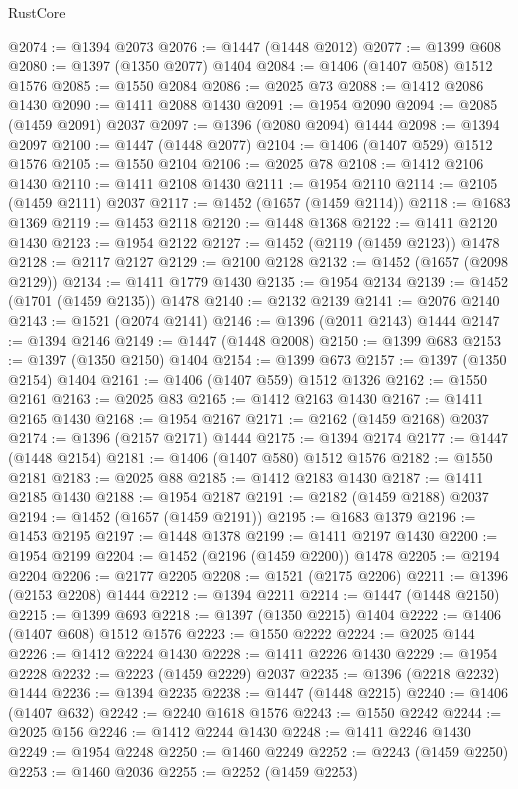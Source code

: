 \begin{lexlean}{RustCore}
\begin{coremodule}
@2074 := @1394 @2073
@2076 := @1447 (@1448 @2012)
@2077 := @1399 @608
@2080 := @1397 (@1350 @2077) @1404
@2084 := @1406 (@1407 @508) @1512 @1576
@2085 := @1550 @2084
@2086 := @2025 @73
@2088 := @1412 @2086 @1430
@2090 := @1411 @2088 @1430
@2091 := @1954 @2090
@2094 := @2085 (@1459 @2091) @2037
@2097 := @1396 (@2080 @2094) @1444
@2098 := @1394 @2097
@2100 := @1447 (@1448 @2077)
@2104 := @1406 (@1407 @529) @1512 @1576
@2105 := @1550 @2104
@2106 := @2025 @78
@2108 := @1412 @2106 @1430
@2110 := @1411 @2108 @1430
@2111 := @1954 @2110
@2114 := @2105 (@1459 @2111) @2037
@2117 := @1452 (@1657 (@1459 @2114))
@2118 := @1683 @1369
@2119 := @1453 @2118
@2120 := @1448 @1368
@2122 := @1411 @2120 @1430
@2123 := @1954 @2122
@2127 := @1452 (@2119 (@1459 @2123)) @1478
@2128 := @2117 @2127
@2129 := @2100 @2128
@2132 := @1452 (@1657 (@2098 @2129))
@2134 := @1411 @1779 @1430
@2135 := @1954 @2134
@2139 := @1452 (@1701 (@1459 @2135)) @1478
@2140 := @2132 @2139
@2141 := @2076 @2140
@2143 := @1521 (@2074 @2141)
@2146 := @1396 (@2011 @2143) @1444
@2147 := @1394 @2146
@2149 := @1447 (@1448 @2008)
@2150 := @1399 @683
@2153 := @1397 (@1350 @2150) @1404
@2154 := @1399 @673
@2157 := @1397 (@1350 @2154) @1404
@2161 := @1406 (@1407 @559) @1512 @1326
@2162 := @1550 @2161
@2163 := @2025 @83
@2165 := @1412 @2163 @1430
@2167 := @1411 @2165 @1430
@2168 := @1954 @2167
@2171 := @2162 (@1459 @2168) @2037
@2174 := @1396 (@2157 @2171) @1444
@2175 := @1394 @2174
@2177 := @1447 (@1448 @2154)
@2181 := @1406 (@1407 @580) @1512 @1576
@2182 := @1550 @2181
@2183 := @2025 @88
@2185 := @1412 @2183 @1430
@2187 := @1411 @2185 @1430
@2188 := @1954 @2187
@2191 := @2182 (@1459 @2188) @2037
@2194 := @1452 (@1657 (@1459 @2191))
@2195 := @1683 @1379
@2196 := @1453 @2195
@2197 := @1448 @1378
@2199 := @1411 @2197 @1430
@2200 := @1954 @2199
@2204 := @1452 (@2196 (@1459 @2200)) @1478
@2205 := @2194 @2204
@2206 := @2177 @2205
@2208 := @1521 (@2175 @2206)
@2211 := @1396 (@2153 @2208) @1444
@2212 := @1394 @2211
@2214 := @1447 (@1448 @2150)
@2215 := @1399 @693
@2218 := @1397 (@1350 @2215) @1404
@2222 := @1406 (@1407 @608) @1512 @1576
@2223 := @1550 @2222
@2224 := @2025 @144
@2226 := @1412 @2224 @1430
@2228 := @1411 @2226 @1430
@2229 := @1954 @2228
@2232 := @2223 (@1459 @2229) @2037
@2235 := @1396 (@2218 @2232) @1444
@2236 := @1394 @2235
@2238 := @1447 (@1448 @2215)
@2240 := @1406 (@1407 @632)
@2242 := @2240 @1618 @1576
@2243 := @1550 @2242
@2244 := @2025 @156
@2246 := @1412 @2244 @1430
@2248 := @1411 @2246 @1430
@2249 := @1954 @2248
@2250 := @1460 @2249
@2252 := @2243 (@1459 @2250)
@2253 := @1460 @2036
@2255 := @2252 (@1459 @2253)

\end{coremodule}
\end{lexlean}
